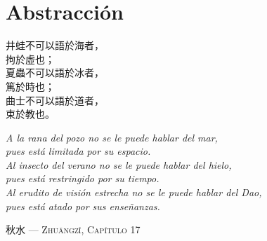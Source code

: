 	{\centering
	\chapter{Abstracción}\label{parte3}}
\thispagestyle{empty}
\noindent
\begin{minipage}[t]{0.35\textwidth}
	\begin{flushright}
		{\large
			\vspace{1pt}
			井蛙不可以語於海者，\\
			拘於虛也；\\[0.5em]
			夏蟲不可以語於冰者，\\
			篤於時也；\\[0.5em]
			曲士不可以語於道者，\\
			束於教也。
		}
	\end{flushright}
\end{minipage}%
\hfill
\vrule
\hfill
\begin{minipage}[t]{0.48\textwidth}
	\vspace{1pt}
	\raggedright
	\emph{
		$\!\!$A la rana del pozo no se le puede hablar del mar,\\
		pues está limitada por su espacio.\\[0.5em]
		Al insecto del verano no se le puede hablar del hielo,\\
		pues está restringido por su tiempo.\\[0.5em]
		Al erudito de visión estrecha no se le puede hablar del Dao,\\
		pues está atado por sus enseñanzas.
	}
\end{minipage}

\vspace{1em}
\hfill {   秋水 — \textsc{Zhuāngzǐ, Capítulo 17}}

